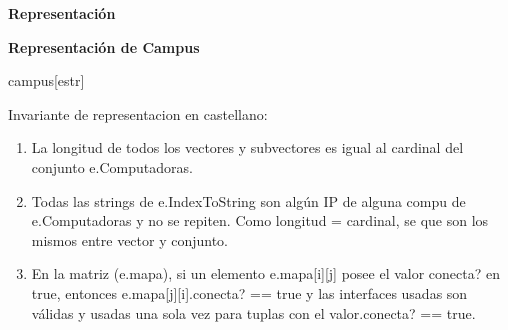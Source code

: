 \documentclass[a4paper,10pt]{article}
\newenvironment{Representacion}{%
  \vspace*{2ex}%
  \noindent\textbf{\Large Representación}%
  \vspace*{2ex}%
}{}
\begin{document}
\begin{Representacion}

\textbf{Representación de Campus}

  \begin{Estructura}{campus}[estr]

    \begin{Tupla}[estr]
    \end{Tupla}
    
  \end{Estructura}	
  
 
  
  Invariante de representacion en castellano:
  \begin{enumerate}
  
  \item La longitud de todos los vectores y subvectores es igual al cardinal del conjunto e.Computadoras.
  \item Todas las strings de e.IndexToString son algún IP de alguna compu de e.Computadoras y no se repiten. Como longitud = cardinal, se que son los mismos entre vector y conjunto.
  \item En la matriz (e.mapa), si un elemento e.mapa[i][j] posee el valor conecta? en true, entonces e.mapa[j][i].conecta? == true y las interfaces usadas son válidas y usadas una sola vez para tuplas con el valor.conecta? == true.
  
  \end{enumerate}
  
\end{Representacion}
\end{document}
